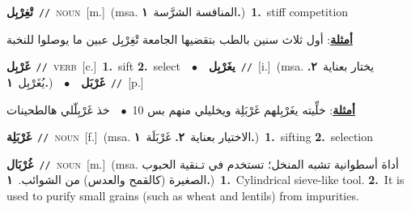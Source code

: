\documentclass[10pt,a4paper,twoside]{article} %
\begin{document}
\begin{multicols}{2}
{{{{{{{{{{{{\setlength\topsep{0pt}\textbf{\foreignlanguage{arabic}{تْغِرْبِل}}\ {\color{gray}\texttt{//}\color{black}}\ \textsc{noun}\ [m.]\ \color{gray}(msa. \foreignlanguage{arabic}{المنافسة الشرَّسة}~\foreignlanguage{arabic}{\textbf{١.}})\color{black}\ \textbf{1.}~stiff competition\  \begin{flushright}\color{gray}\foreignlanguage{arabic}{\textbf{\underline{\foreignlanguage{arabic}{أمثلة}}}: أول ثلاث سنين بالطب بتقضيها الجامعة تْغِرْبِل عبين ما يوصلوا للنخبة}\end{flushright}\color{black}} \vspace{2mm}

{\setlength\topsep{0pt}\textbf{\foreignlanguage{arabic}{غَرْبِل}}\ {\color{gray}\texttt{//}\color{black}}\ \textsc{verb}\ [c.]\ \textbf{1.}~sift  \textbf{2.}~select\ \ $\bullet$\ \ \setlength\topsep{0pt}\textbf{\foreignlanguage{arabic}{يغَرْبِل}}\ {\color{gray}\texttt{//}\color{black}}\ [i.]\ \color{gray}(msa. \foreignlanguage{arabic}{يختار بعناية}~\foreignlanguage{arabic}{\textbf{٢.}}  \foreignlanguage{arabic}{يُغَرْبِل}~\foreignlanguage{arabic}{\textbf{١.}})\color{black}\ \ $\bullet$\ \ \setlength\topsep{0pt}\textbf{\foreignlanguage{arabic}{غَرْبَل}}\ {\color{gray}\texttt{//}\color{black}}\ [p.]\  \begin{flushright}\color{gray}\foreignlanguage{arabic}{\textbf{\underline{\foreignlanguage{arabic}{أمثلة}}}: خلِّيته يغَرْبِلهم غَرْبَلِة ويخليلي منهم بس 10\ $\bullet$\ \  خذ غَرْبِلّلي هالطحينات}\end{flushright}\color{black}} \vspace{2mm}

{\setlength\topsep{0pt}\textbf{\foreignlanguage{arabic}{غَرْبَلِة}}\ {\color{gray}\texttt{//}\color{black}}\ \textsc{noun}\ [f.]\ \color{gray}(msa. \foreignlanguage{arabic}{الاختيار بعناية}~\foreignlanguage{arabic}{\textbf{٢.}}  \foreignlanguage{arabic}{غَرْبَلَة}~\foreignlanguage{arabic}{\textbf{١.}})\color{black}\ \textbf{1.}~sifting  \textbf{2.}~selection\ 

{\setlength\topsep{0pt}\textbf{\foreignlanguage{arabic}{غُرْبَال}}\ {\color{gray}\texttt{//}\color{black}}\ \textsc{noun}\ [m.]\ \color{gray}(msa. \foreignlanguage{arabic}{أداة أسطوانية تشبه المنخل؛ تستخدم في تـنقية الحبوب الصغيرة (كالقمح والعدس) من الشوائب.}~\foreignlanguage{arabic}{\textbf{١.}})\color{black}\ \textbf{1.}~Cylindrical sieve-like tool.  \textbf{2.}~It is used to purify small grains (such as wheat and lentils) from impurities.\ 

}}}}}}}}}}}}}
\end{multicols}
\end{document}
